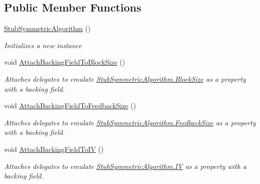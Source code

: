 \subsection*{Public Member Functions}
\begin{DoxyCompactItemize}
\item 
\hyperlink{class_system_1_1_security_1_1_cryptography_1_1_fakes_1_1_stub_symmetric_algorithm_a23e8ff9dfcfd9e466401250d161feb74}{Stub\-Symmetric\-Algorithm} ()
\begin{DoxyCompactList}\small\item\em Initializes a new instance\end{DoxyCompactList}\item 
void \hyperlink{class_system_1_1_security_1_1_cryptography_1_1_fakes_1_1_stub_symmetric_algorithm_a8f22d950aa577056c7960665ed6e24a8}{Attach\-Backing\-Field\-To\-Block\-Size} ()
\begin{DoxyCompactList}\small\item\em Attaches delegates to emulate \hyperlink{class_system_1_1_security_1_1_cryptography_1_1_fakes_1_1_stub_symmetric_algorithm_aa3626e199cbe22b8e1343775a52f3aa0}{Stub\-Symmetric\-Algorithm.\-Block\-Size} as a property with a backing field.\end{DoxyCompactList}\item 
void \hyperlink{class_system_1_1_security_1_1_cryptography_1_1_fakes_1_1_stub_symmetric_algorithm_a40e3f15b94058d518e46cf0840ac5984}{Attach\-Backing\-Field\-To\-Feedback\-Size} ()
\begin{DoxyCompactList}\small\item\em Attaches delegates to emulate \hyperlink{class_system_1_1_security_1_1_cryptography_1_1_fakes_1_1_stub_symmetric_algorithm_a0ba703b1e984509f1c6e531de11661b8}{Stub\-Symmetric\-Algorithm.\-Feedback\-Size} as a property with a backing field.\end{DoxyCompactList}\item 
void \hyperlink{class_system_1_1_security_1_1_cryptography_1_1_fakes_1_1_stub_symmetric_algorithm_a2f1f1f05a1a7ddff22a0def84d183707}{Attach\-Backing\-Field\-To\-I\-V} ()
\begin{DoxyCompactList}\small\item\em Attaches delegates to emulate \hyperlink{class_system_1_1_security_1_1_cryptography_1_1_fakes_1_1_stub_symmetric_algorithm_a764a03900faf7cca8cbcdbf3e2d0adb9}{Stub\-Symmetric\-Algorithm.\-I\-V} as a property with a backing field.\end{DoxyCompactList}\item 

\end{DoxyCompactItemize}
